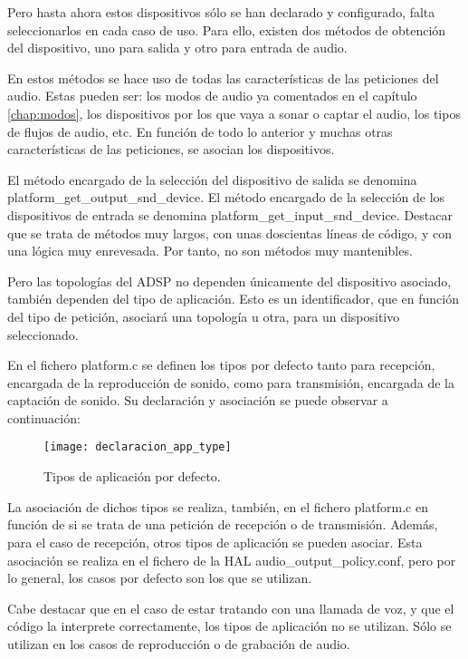 Pero hasta ahora estos dispositivos sólo se han declarado y configurado, falta seleccionarlos en cada caso de uso. Para ello, existen dos métodos de obtención del dispositivo, uno para salida y otro para entrada de audio. 

En estos métodos se hace uso de todas las características de las peticiones del audio. Estas pueden ser: los modos de audio ya comentados en el capítulo \ref{chap:modos}, los dispositivos por los que vaya a sonar o captar el audio, los tipos de flujos de audio, etc. En función de todo lo anterior y muchas otras características de las peticiones, se asocian los dispositivos.

El método encargado de la selección del dispositivo de salida se denomina platform\_get\_output\_snd\_device. El método encargado de la selección de los dispositivos de entrada se denomina platform\_get\_input\_snd\_device. Destacar que se trata de métodos muy largos, con unas doscientas líneas de código, y con una lógica muy enrevesada. Por tanto, no son métodos muy mantenibles.

Pero las topologías del \gls{ADSP} no dependen únicamente del dispositivo asociado, también dependen del tipo de aplicación. Esto es un identificador, que en función del tipo de petición, asociará una topología u otra, para un dispositivo seleccionado.

En el fichero platform.c se definen los tipos por defecto tanto para recepción, encargada de la reproducción de sonido, como para transmisión, encargada de la captación de sonido. Su declaración y asociación se puede observar a continuación:

\begin{figure}[H]
	\centering
	\texttt{[image: declaracion\_app\_type]}
	\caption{Tipos de aplicación por defecto.} 
	\label{fig:default_app_type}
\end{figure} 

La asociación de dichos tipos se realiza, también, en el fichero platform.c en función de si se trata de una petición de recepción o de transmisión. Además, para el caso de recepción, otros tipos de aplicación se pueden asociar. Esta asociación se realiza en el fichero de la \gls{HAL} audio\_output\_policy.conf, pero por lo general, los casos por defecto son los que se utilizan.

Cabe destacar que en el caso de estar tratando con una llamada de voz, y que el código la interprete correctamente, los tipos de aplicación no se utilizan. Sólo se utilizan en los casos de reproducción o de grabación de audio.

